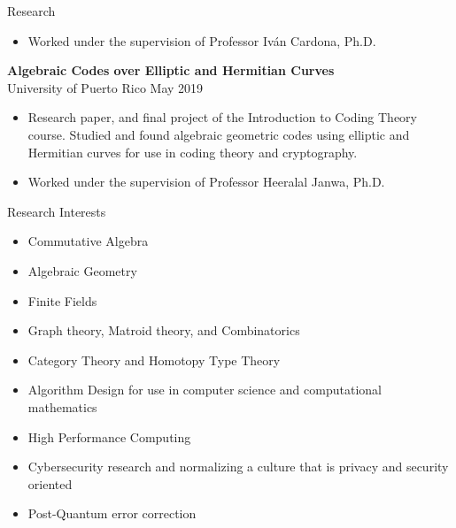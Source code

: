 \documentclass{resume} %
\begin{document}
\begin{rSection}{Research}
\begin{itemize}
        \item Worked under the supervision of Professor Iv\'an Cardona, Ph.D.
    \end{itemize}

    \textbf{Algebraic Codes over Elliptic and Hermitian
    Curves} \\
    University of Puerto Rico \hfill{May 2019}
    \begin{itemize}
        \item Research paper, and final project of the Introduction to Coding
            Theory course. Studied and found algebraic geometric codes using
            elliptic and Hermitian curves for use in coding theory and
            cryptography.

        \item Worked under the supervision of Professor Heeralal Janwa, Ph.D.
    \end{itemize}
\end{rSection}


\begin{rSection}{Research Interests}
    \begin{multicols}{2}
      \begin{itemize}
        \item Commutative Algebra

        \item Algebraic Geometry

        \item Finite Fields

        \item Graph theory, Matroid theory, and Combinatorics

        \item Category Theory and Homotopy Type Theory

        \item Algorithm Design for use in computer science and computational
            mathematics

        \item High Performance Computing

        \item Cybersecurity research and normalizing a culture that is privacy
            and security oriented

        \item Post-Quantum error correction
      \end{itemize}
    \end{multicols}
\end{rSection}
\end{document}
